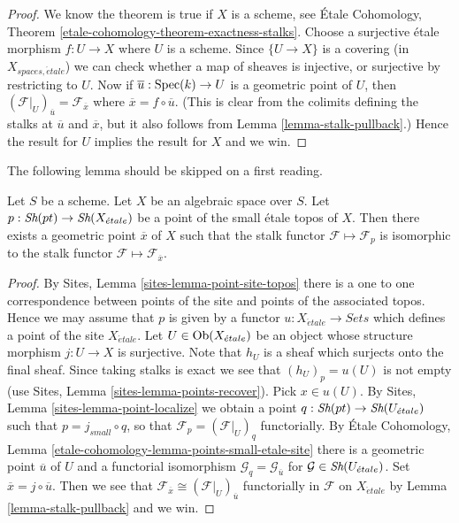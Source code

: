 \begin{proof}
We know the theorem is true if $X$ is a scheme, see
\'Etale Cohomology, Theorem \ref{etale-cohomology-theorem-exactness-stalks}.
Choose a surjective \'etale morphism $f : U \to X$ where $U$ is a scheme.
Since $\{U \to X\}$ is a covering (in $X_{spaces, \acute{e}tale}$) we can check
whether a map of sheaves is injective, or surjective by restricting
to $U$. Now if $\overline{u} : \mathop{\rm Spec}(k) \to U$ is a geometric
point of $U$, then
$(\mathcal{F}|_U)_{\overline{u}} = \mathcal{F}_{\overline{x}}$
where $\overline{x} = f \circ \overline{u}$. (This is clear from the
colimits defining the stalks at $\overline{u}$ and $\overline{x}$, but
it also follows from
Lemma \ref{lemma-stalk-pullback}.)
Hence the result for $U$ implies the result for $X$ and we win.
\end{proof}

\noindent
The following lemma should be skipped on a first reading.

\begin{lemma}
\label{lemma-points-small-etale-site}
Let $S$ be a scheme.
Let $X$ be an algebraic space over $S$.
Let $p : \mathop{\textit{Sh}}\nolimits(pt) \to \mathop{\textit{Sh}}\nolimits(X_{\acute{e}tale})$
be a point of the small \'etale topos of $X$.
Then there exists a geometric point $\overline{x}$ of $X$
such that the stalk functor $\mathcal{F} \mapsto \mathcal{F}_p$
is isomorphic to the stalk functor
$\mathcal{F} \mapsto \mathcal{F}_{\overline{x}}$.
\end{lemma}

\begin{proof}
By
Sites, Lemma \ref{sites-lemma-point-site-topos}
there is a one to one correspondence between points of the site and points
of the associated topos. Hence we may assume that $p$ is given by
a functor $u : X_{\acute{e}tale} \to \textit{Sets}$ which defines a point
of the site $X_{\acute{e}tale}$.
Let $U \in \mathop{\rm Ob}\nolimits(X_{\acute{e}tale})$ be an object whose structure morphism
$j : U \to X$ is surjective. Note that $h_U$ is a sheaf
which surjects onto the final sheaf. Since taking stalks is exact
we see that $(h_U)_p = u(U)$ is not empty (use
Sites, Lemma \ref{sites-lemma-points-recover}).
Pick $x \in u(U)$. By
Sites, Lemma \ref{sites-lemma-point-localize}
we obtain a point $q : \mathop{\textit{Sh}}\nolimits(pt) \to \mathop{\textit{Sh}}\nolimits(U_{\acute{e}tale})$
such that $p = j_{small} \circ q$, so that
$\mathcal{F}_p = (\mathcal{F}|_U)_q$ functorially.
By
\'Etale Cohomology, Lemma \ref{etale-cohomology-lemma-points-small-etale-site}
there is a geometric point $\overline{u}$ of $U$ and a functorial
isomorphism $\mathcal{G}_q = \mathcal{G}_{\overline{u}}$
for $\mathcal{G} \in \mathop{\textit{Sh}}\nolimits(U_{\acute{e}tale})$. Set
$\overline{x} = j \circ \overline{u}$. Then we see that
$\mathcal{F}_{\overline{x}} \cong (\mathcal{F}|_U)_{\overline{u}}$
functorially in $\mathcal{F}$ on $X_{\acute{e}tale}$ by
Lemma \ref{lemma-stalk-pullback}
and we win.
\end{proof}





